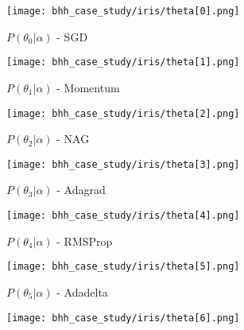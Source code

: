 \begin{figure}[htbp]
      \begin{subfigure}{0.5\textwidth}
            \centering
            \texttt{[image: bhh\_case\_study/iris/theta[0].png]}
            \caption{$P(\theta_{0} | \alpha)$ - \Acs{SGD}}
            \label{fig:results:case_study:iris:p_theta:0}
      \end{subfigure}
      \begin{subfigure}{0.5\textwidth}
            \centering
            \texttt{[image: bhh\_case\_study/iris/theta[1].png]}
            \caption{$P(\theta_{1} | \alpha)$ - \Acs{Momentum}}
            \label{fig:results:case_study:iris:p_theta:1}
      \end{subfigure}
      \par\medskip
      \begin{subfigure}{0.5\textwidth}
            \centering
            \texttt{[image: bhh\_case\_study/iris/theta[2].png]}
            \caption{$P(\theta_{2} | \alpha)$ - \Acs{NAG}}
            \label{fig:results:case_study:iris:p_theta:2}
      \end{subfigure}
      \begin{subfigure}{0.5\textwidth}
            \centering
            \texttt{[image: bhh\_case\_study/iris/theta[3].png]}
            \caption{$P(\theta_{3} | \alpha)$ - \Acs{Adagrad}}
            \label{fig:results:case_study:iris:p_theta:3}
      \end{subfigure}
      \par\medskip
      \begin{subfigure}{0.5\textwidth}
            \centering
            \texttt{[image: bhh\_case\_study/iris/theta[4].png]}
            \caption{$P(\theta_{4} | \alpha)$ - \Acs{RMSProp}}
            \label{fig:results:case_study:iris:p_theta:4}
      \end{subfigure}
      \begin{subfigure}{0.5\textwidth}
            \centering
            \texttt{[image: bhh\_case\_study/iris/theta[5].png]}
            \caption{$P(\theta_{5} | \alpha)$ - \Acs{Adadelta}}
            \label{fig:results:case_study:iris:p_theta:5}
      \end{subfigure}
      \par\medskip
      \begin{subfigure}{0.5\textwidth}
            \centering
            \texttt{[image: bhh\_case\_study/iris/theta[6].png]}

\end{subfigure}
\end{figure}
